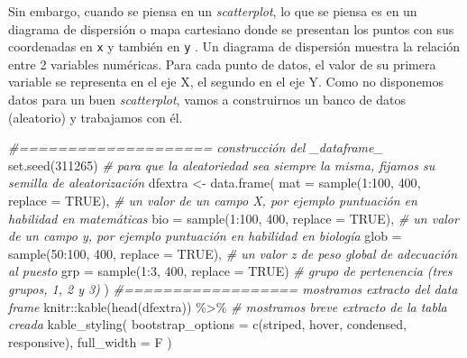 \documentclass[
]{book}
\newenvironment{Shaded}{\begin{snugshade}}{\end{snugshade}}
\newcommand{\AttributeTok}[1]{\textcolor[rgb]{0.77,0.63,0.00}{#1}}
\newcommand{\CommentTok}[1]{\textcolor[rgb]{0.56,0.35,0.01}{\textit{#1}}}
\newcommand{\ConstantTok}[1]{\textcolor[rgb]{0.00,0.00,0.00}{#1}}
\newcommand{\DecValTok}[1]{\textcolor[rgb]{0.00,0.00,0.81}{#1}}
\newcommand{\FunctionTok}[1]{\textcolor[rgb]{0.00,0.00,0.00}{#1}}
\newcommand{\NormalTok}[1]{#1}
\newcommand{\OtherTok}[1]{\textcolor[rgb]{0.56,0.35,0.01}{#1}}
\newcommand{\SpecialCharTok}[1]{\textcolor[rgb]{0.00,0.00,0.00}{#1}}
\newcommand{\StringTok}[1]{\textcolor[rgb]{0.31,0.60,0.02}{#1}}
\begin{document}
Sin embargo, cuando se piensa en un \emph{scatterplot}, lo que se piensa es en un diagrama de dispersión o mapa cartesiano donde se presentan los puntos con sus coordenadas en \texttt{x} y también en \texttt{y} . Un diagrama de dispersión muestra la relación entre 2 variables numéricas. Para cada punto de datos, el valor de su primera variable se representa en el eje X, el segundo en el eje Y. Como no disponemos datos para un buen \emph{scatterplot}, vamos a construirnos un banco de datos (aleatorio) y trabajamos con él.

\begin{Shaded}
\begin{Highlighting}[]
\CommentTok{\#==================== construcción del \_dataframe\_}
\FunctionTok{set.seed}\NormalTok{(}\DecValTok{311265}\NormalTok{) }\CommentTok{\# para que la aleatoriedad sea siempre la misma, fijamos su semilla de aleatorización}
\NormalTok{dfextra }\OtherTok{\textless{}{-}}
     \FunctionTok{data.frame}\NormalTok{(}
          \AttributeTok{mat =} \FunctionTok{sample}\NormalTok{(}\DecValTok{1}\SpecialCharTok{:}\DecValTok{100}\NormalTok{, }\DecValTok{400}\NormalTok{, }\AttributeTok{replace =} \ConstantTok{TRUE}\NormalTok{),}
          \CommentTok{\# un valor de un campo X, por ejemplo puntuación en habilidad en matemáticas}
          \AttributeTok{bio =} \FunctionTok{sample}\NormalTok{(}\DecValTok{1}\SpecialCharTok{:}\DecValTok{100}\NormalTok{, }\DecValTok{400}\NormalTok{, }\AttributeTok{replace =} \ConstantTok{TRUE}\NormalTok{),}
          \CommentTok{\# un valor de un campo y, por ejemplo puntuación en habilidad en biología}
          \AttributeTok{glob =} \FunctionTok{sample}\NormalTok{(}\DecValTok{50}\SpecialCharTok{:}\DecValTok{100}\NormalTok{, }\DecValTok{400}\NormalTok{, }\AttributeTok{replace =} \ConstantTok{TRUE}\NormalTok{),}
          \CommentTok{\# un valor z de peso global de adecuación al puesto}
          \AttributeTok{grp =} \FunctionTok{sample}\NormalTok{(}\DecValTok{1}\SpecialCharTok{:}\DecValTok{3}\NormalTok{, }\DecValTok{400}\NormalTok{, }\AttributeTok{replace =} \ConstantTok{TRUE}\NormalTok{) }\CommentTok{\# grupo de pertenencia (tres grupos, 1, 2 y 3)}
\NormalTok{     )}
\CommentTok{\#================== mostramos extracto del data frame}
\NormalTok{knitr}\SpecialCharTok{::}\FunctionTok{kable}\NormalTok{(}\FunctionTok{head}\NormalTok{(dfextra)) }\SpecialCharTok{\%\textgreater{}\%} \CommentTok{\# mostramos breve extracto de la tabla creada}
     \FunctionTok{kable\_styling}\NormalTok{(}
          \AttributeTok{bootstrap\_options =} \FunctionTok{c}\NormalTok{(}\StringTok{\textquotesingle{}striped\textquotesingle{}}\NormalTok{, }\StringTok{\textquotesingle{}hover\textquotesingle{}}\NormalTok{, }\StringTok{\textquotesingle{}condensed\textquotesingle{}}\NormalTok{, }\StringTok{\textquotesingle{}responsive\textquotesingle{}}\NormalTok{),}
          \AttributeTok{full\_width =}\NormalTok{ F}
\NormalTok{     ) }
\end{Highlighting}
\end{Shaded}
\end{document}
